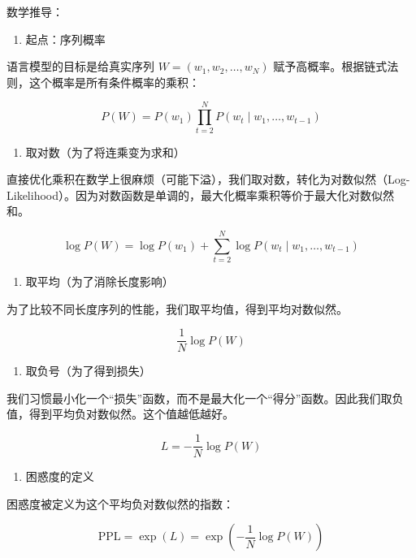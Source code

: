 数学推导：

\begin{enumerate}
\def\labelenumi{\arabic{enumi}.}
\tightlist
\item
  起点：序列概率
\end{enumerate}

语言模型的目标是给真实序列 \(W=(w_1,w_2,\ldots,w_N)\) 赋予高概率。根据链式法则，这个概率是所有条件概率的乘积：

\[
P(W)=P(w_1)\prod_{t=2}^{N}P(w_t\mid w_1,\ldots,w_{t-1})
\]

\begin{enumerate}
\def\labelenumi{\arabic{enumi}.}
\setcounter{enumi}{1}
\tightlist
\item
  取对数（为了将连乘变为求和）
\end{enumerate}

直接优化乘积在数学上很麻烦（可能下溢），我们取对数，转化为对数似然（Log-Likelihood）。因为对数函数是单调的，最大化概率乘积等价于最大化对数似然和。

\[
\log P(W)=\log P(w_1)+\sum_{t=2}^{N}\log P(w_t\mid w_1,\ldots,w_{t-1})
\]

\begin{enumerate}
\def\labelenumi{\arabic{enumi}.}
\setcounter{enumi}{2}
\tightlist
\item
  取平均（为了消除长度影响）
\end{enumerate}

为了比较不同长度序列的性能，我们取平均值，得到平均对数似然。

\[
\frac{1}{N}\log P(W)
\]

\begin{enumerate}
\def\labelenumi{\arabic{enumi}.}
\setcounter{enumi}{3}
\tightlist
\item
  取负号（为了得到损失）
\end{enumerate}

我们习惯最小化一个``损失''函数，而不是最大化一个``得分''函数。因此我们取负值，得到平均负对数似然。这个值越低越好。

\[
L=-\frac{1}{N}\log P(W)
\]

\begin{enumerate}
\def\labelenumi{\arabic{enumi}.}
\setcounter{enumi}{4}
\tightlist
\item
  困惑度的定义
\end{enumerate}

困惑度被定义为这个平均负对数似然的指数：

\[
\mathrm{PPL}=\exp(L)=\exp\left(-\frac{1}{N}\log P(W)\right)
\]

